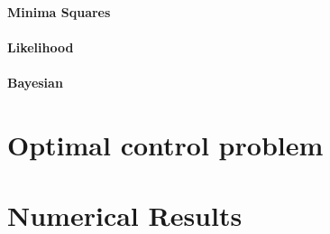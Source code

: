 \documentclass[a4paper,10pt]{amsart}
\begin{document}
    \paragraph{Minima Squares}
        \paragraph{Likelihood}
        \paragraph{Bayesian}
    \section{Optimal control problem}
    \section{Numerical Results}
\end{document}
